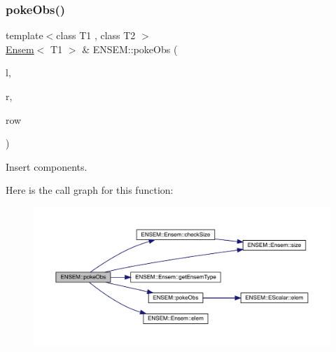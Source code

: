 \subsubsection{\texorpdfstring{pokeObs()}{pokeObs()}\hspace{0.1cm}{\footnotesize\ttfamily [1/2]}}
{\footnotesize\ttfamily template$<$class T1 , class T2 $>$ \\
\mbox{\hyperlink{classENSEM_1_1Ensem}{Ensem}}$<$ T1 $>$ \& E\+N\+S\+E\+M\+::poke\+Obs (\begin{DoxyParamCaption}\item[{\mbox{\hyperlink{classENSEM_1_1Ensem}{Ensem}}$<$ T1 $>$ \&}]{l,  }\item[{const \mbox{\hyperlink{classENSEM_1_1Ensem}{Ensem}}$<$ T2 $>$ \&}]{r,  }\item[{int}]{row }\end{DoxyParamCaption})\hspace{0.3cm}{\ttfamily [inline]}}



Insert components. 

Here is the call graph for this function\+:\nopagebreak
\begin{figure}[H]
\begin{center}
\leavevmode
\includegraphics[width=350pt]{d1/d9e/group__eensem_ga44fada3144f6b1bb4d161722a389abd9_cgraph}
\end{center}
\end{figure}
\mbox{\label{group__eensem_gaf4969f408bf59ed0fb219c61def36156}} 
